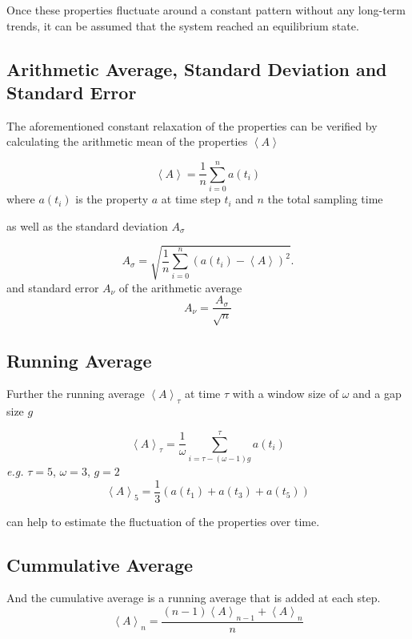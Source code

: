 \documentclass[
  letterpaper,
]{article}
\begin{document}
Once these properties fluctuate around a constant pattern without any
long-term trends, it can be assumed that the system reached an
equilibrium state.

\hypertarget{arithmetic-average-standard-deviation-and-standard-error}{%
\subsection{Arithmetic Average, Standard Deviation and Standard
Error}\label{arithmetic-average-standard-deviation-and-standard-error}}

The aforementioned constant relaxation of the properties can be verified
by calculating the arithmetic mean of the properties
\(\left < A \right >\)

\[
\left < A \right >  = \frac{1}{n}\sum_{i=0}^{n} a(t_{i})
\] where \(a(t_{i})\) is the property \(a\) at time step \(t_i\) and
\(n\) the total sampling time

as well as the standard deviation \(A_{\sigma }\)

\[
A_{\sigma }= \sqrt{ \frac{1}{n}\sum_{i=0}^{n} (a(t_{i}) - \left < A \right > )^2}.
\] and standard error \(A_{\nu}\) of the arithmetic average \[
A_{\nu} = \frac{A_{\sigma }}{\sqrt{n}}
\]

\hypertarget{running-average}{%
\subsection{Running Average}\label{running-average}}

Further the running average \(\left < A \right >_{\tau}\) at time
\(\tau\) with a window size of \(\omega\) and a gap size \(g\)

\[
\left < A \right >_{\tau} = \frac{1}{\omega}\sum_{i=\tau-(\omega-1)g}^{\tau} a(t_{i})
\] \emph{e.g.} \(\tau=5\), \(\omega=3\), \(g=2\) \[
\left < A \right >_{5} = \frac{1}{3} (a(t_{1})+a(t_{3})+a(t_{5}))
\]

can help to estimate the fluctuation of the properties over time.

\hypertarget{cummulative-average}{%
\subsection{Cummulative Average}\label{cummulative-average}}

And the cumulative average is a running average that is added at each
step. \[
\left < A \right >_n = \frac{(n-1)\left < A \right >_{n-1} + \left < A \right >_n}{n}
\]
\end{document}
